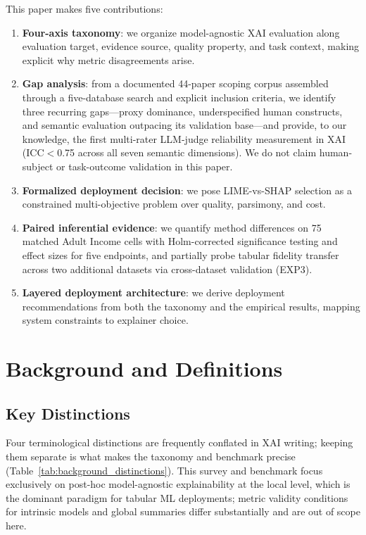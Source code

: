 \documentclass[twoside,11pt]{article}
\begin{document}
This paper makes five contributions:
\begin{enumerate}[leftmargin=*]
\item \textbf{Four-axis taxonomy}: we organize model-agnostic XAI
evaluation along evaluation target, evidence source, quality property,
and task context, making explicit why metric disagreements arise.
\item \textbf{Gap analysis}: from a documented 44-paper scoping corpus
assembled through a five-database search and explicit inclusion criteria,
we identify three recurring gaps---proxy dominance, underspecified human constructs, and semantic
evaluation outpacing its validation base---and provide, to our
knowledge, the first multi-rater LLM-judge reliability measurement in
XAI (ICC$<$0.75 across all seven semantic dimensions). We do not claim
human-subject or task-outcome validation in this paper.
\item \textbf{Formalized deployment decision}: we pose LIME-vs-SHAP
selection as a constrained multi-objective problem over quality, parsimony,
and cost.
\item \textbf{Paired inferential evidence}: we quantify method differences
on 75 matched Adult Income cells with Holm-corrected significance testing
and effect sizes for five endpoints, and partially probe tabular fidelity
transfer across two additional datasets via cross-dataset validation
(EXP3).
\item \textbf{Layered deployment architecture}: we derive deployment
recommendations from both the taxonomy and the empirical results, mapping
system constraints to explainer choice.
\end{enumerate}

\section{Background and Definitions}
\label{sec:background}

\subsection{Key Distinctions}

Four terminological distinctions are frequently conflated in XAI writing;
keeping them separate is what makes the taxonomy and benchmark precise
(Table~\ref{tab:background_distinctions}). This survey and benchmark focus
exclusively on post-hoc model-agnostic explainability at the local level,
which is the dominant paradigm for tabular ML deployments; metric validity
conditions for intrinsic models and global summaries differ substantially
and are out of scope here.
\end{document}

